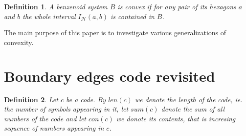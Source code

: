 \documentclass[a4paper,10pt]{article}
\newcounter{theorem}
\newtheorem{definition}{Definition}[section]
\begin{document}
\begin{definition}
\label{def:original}
A benzenoid system $B$ is \emph{convex} if for any pair of its hexagons $a$ and $b$ the whole interval $I_\mathcal{H}(a,b)$ is contained in $B$.
\end{definition}

The main purpose of this paper is to investigate various generalizations of convexity.

\section{Boundary edges code revisited}

\begin{definition}
Let $c$ be a code. By $len(c)$ we denote the length of the code, ie. the number of symbols appearing in it, let $sum(c)$ denote the sum of all numbers of the code and let $con(c)$ we donote its \emph{contents}, that is incresing sequence of numbers appearing in $c$.
\end{definition}
\end{document}
